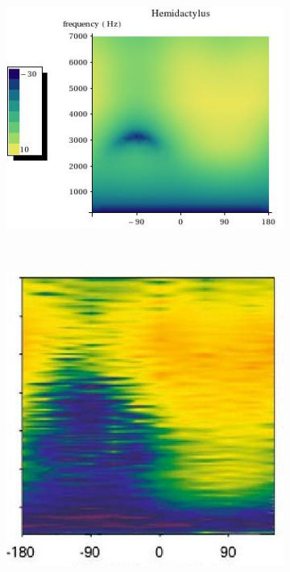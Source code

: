 \begin{figure}
        \centering
        \begin{subfigure}[b]{0.43\textwidth}
                \centering
                \includegraphics[width=\textwidth]{Diagrams/Plots/hemidactylusvibamp.jpeg}
              
        \end{subfigure}%
        ~ %
        \begin{subfigure}[b]{0.29\textwidth}
                \centering
                \includegraphics[width=\textwidth]{Diagrams/Plots/hemidactylusvibamp_exp.jpeg}


\end{subfigure}
\end{figure}

